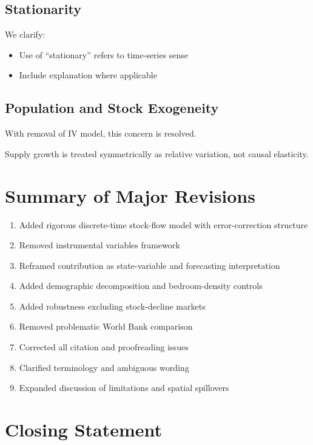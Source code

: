 \documentclass[12pt]{article}
\begin{document}
\subsection*{Stationarity}

We clarify:

\begin{itemize}
\item Use of “stationary” refers to time-series sense
\item Include explanation where applicable
\end{itemize}

\subsection*{Population and Stock Exogeneity}

With removal of IV model, this concern is resolved.

Supply growth is treated symmetrically as relative variation, not causal elasticity.

\section*{Summary of Major Revisions}

\begin{enumerate}
\item Added rigorous discrete-time stock-flow model with error-correction structure
\item Removed instrumental variables framework
\item Reframed contribution as state-variable and forecasting interpretation
\item Added demographic decomposition and bedroom-density controls
\item Added robustness excluding stock-decline markets
\item Removed problematic World Bank comparison
\item Corrected all citation and proofreading issues
\item Clarified terminology and ambiguous wording
\item Expanded discussion of limitations and spatial spillovers
\end{enumerate}

\section*{Closing Statement}
\end{document}
